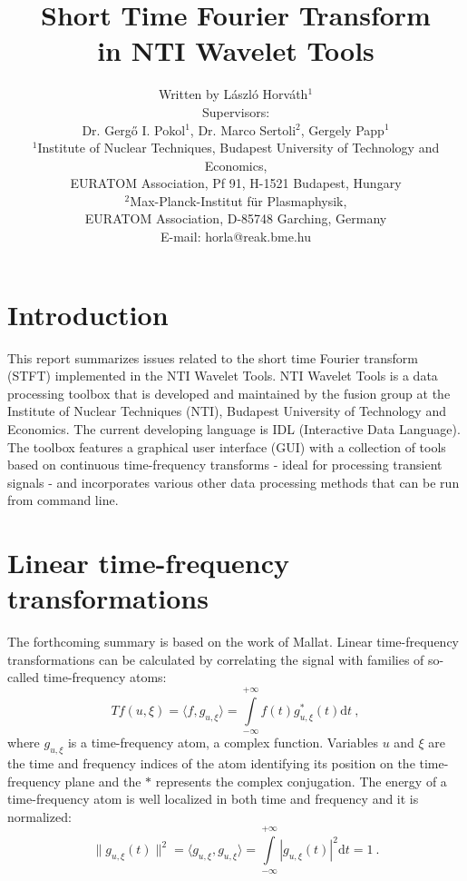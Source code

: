 \documentclass[a4paper,12pt,oneside]{article}
\title{\textbf{Short Time Fourier Transform\\in NTI Wavelet Tools}}
\author{
Written by László Horváth$^1$ \vspace{0.3 cm}\\
Supervisors:\\
Dr. Gergő I. Pokol$^1$, Dr. Marco Sertoli$^2$, Gergely Papp$^1$ \vspace{0.3 cm}\\ 
{\footnotesize $^1$Institute of Nuclear Techniques, Budapest University of Technology and Economics,}\vspace{-0.2 cm}\\
{\footnotesize EURATOM Association, Pf 91, H-1521 Budapest, Hungary
}\\
{\footnotesize $^2$Max-Planck-Institut für Plasmaphysik,}\vspace{-0.2 cm}\\
{\footnotesize EURATOM Association, D-85748 Garching, Germany}\\
{\footnotesize E-mail: horla@reak.bme.hu}}
\newcommand{\dt}{\mathrm{d}t}
\begin{document}



\tableofcontents


\thispagestyle{empty}
\newpage

\section{Introduction}

This report summarizes issues related to the short time Fourier transform (STFT) implemented in the NTI Wavelet Tools. NTI Wavelet Tools\cite{nti12} is a data processing toolbox that is developed and maintained by the fusion group at the Institute of Nuclear Techniques (NTI), Budapest University of Technology and Economics. The current developing language is IDL\cite{idl12} (Interactive Data Language). The toolbox features a graphical user interface (GUI) with a collection of tools based on continuous time-frequency transforms - ideal for processing transient signals - and incorporates various other data processing methods that can be run from command line.

\section{Linear time-frequency transformations}

The forthcoming summary is based on the work of Mallat\cite{mallat08wavelet}. Linear time-frequency transformations can be calculated by correlating the signal with families of so-called time-frequency atoms:
\begin{equation}\label{eq:transform}
  T f(u,\xi) = \langle f, g_{u, \xi} \rangle = \int\limits_{-\infty}^{+\infty} f(t) g^*_{u, \xi}(t) \dt\ ,
\end{equation}
where $g_{u, \xi}$ is a time-frequency atom, a complex function. Variables $u$ and $\xi$ are the time and frequency indices of the atom identifying its position on the time-frequency plane and the $*$ represents the complex conjugation. The energy of a time-frequency atom is well localized in both time and frequency and it is normalized:
\begin{equation}
  \| g_{u, \xi}(t) \|^2 = \langle g_{u, \xi},g_{u, \xi} \rangle = \int\limits_{-\infty}^{+\infty} |g_{u, \xi}(t)|^2 \dt = 1 \ .
\end{equation}
\end{document}
